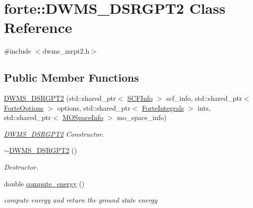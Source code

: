 \hypertarget{classforte_1_1_d_w_m_s___d_s_r_g_p_t2}{}\section{forte\+:\+:D\+W\+M\+S\+\_\+\+D\+S\+R\+G\+P\+T2 Class Reference}
\label{classforte_1_1_d_w_m_s___d_s_r_g_p_t2}


{\ttfamily \#include $<$dwms\+\_\+mrpt2.\+h$>$}

\subsection*{Public Member Functions}
\begin{DoxyCompactItemize}
\item 
\mbox{\hyperlink{classforte_1_1_d_w_m_s___d_s_r_g_p_t2_a1bb39d459e3fd008a0474ac5788a7e81}{D\+W\+M\+S\+\_\+\+D\+S\+R\+G\+P\+T2}} (std\+::shared\+\_\+ptr$<$ \mbox{\hyperlink{classforte_1_1_s_c_f_info}{S\+C\+F\+Info}} $>$ scf\+\_\+info, std\+::shared\+\_\+ptr$<$ \mbox{\hyperlink{classforte_1_1_forte_options}{Forte\+Options}} $>$ options, std\+::shared\+\_\+ptr$<$ \mbox{\hyperlink{classforte_1_1_forte_integrals}{Forte\+Integrals}} $>$ ints, std\+::shared\+\_\+ptr$<$ \mbox{\hyperlink{classforte_1_1_m_o_space_info}{M\+O\+Space\+Info}} $>$ mo\+\_\+space\+\_\+info)
\begin{DoxyCompactList}\small\item\em \mbox{\hyperlink{classforte_1_1_d_w_m_s___d_s_r_g_p_t2}{D\+W\+M\+S\+\_\+\+D\+S\+R\+G\+P\+T2}} Constructor. \end{DoxyCompactList}\item 
\mbox{\hyperlink{classforte_1_1_d_w_m_s___d_s_r_g_p_t2_a9e31f86cd9551e571cb151d2e981dc1c}{$\sim$\+D\+W\+M\+S\+\_\+\+D\+S\+R\+G\+P\+T2}} ()
\begin{DoxyCompactList}\small\item\em Destructor. \end{DoxyCompactList}\item 
double \mbox{\hyperlink{classforte_1_1_d_w_m_s___d_s_r_g_p_t2_a61564604a8e13f4ef0ea6cd9de6430c0}{compute\+\_\+energy}} ()
\begin{DoxyCompactList}\small\item\em compute energy and return the ground state energy \end{DoxyCompactList}\end{DoxyCompactItemize}


